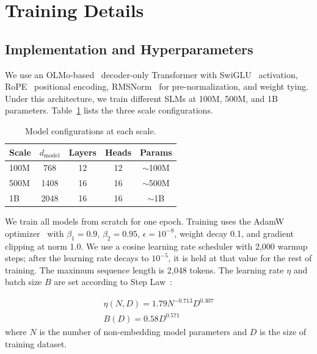 \documentclass[11pt]{article}
\begin{document}


\appendix

\section{Training Details}
\label{sec:training}

\subsection{Implementation and Hyperparameters}

We use an OLMo-based~\cite{groeneveld-etal-2024-olmo} decoder-only Transformer with SwiGLU~\cite{shazeer2020gluSWIGLU} activation, RoPE~\cite{su2024roformerROPE} positional encoding, RMSNorm~\cite{zhang2019rootRMS} for pre-normalization, and weight tying.
Under this architecture, we train different SLMs at 100M, 500M, and 1B parameters. Table~\ref{tab:scales} lists the three scale configurations.

\begin{table}[htbp]
  \centering
  \begin{tabular}{lcccc}
    \toprule
    Scale & $d_\text{model}$ & Layers & Heads & Params \\
    \midrule
    100M & 768 & 12 & 12 & $\sim$100M \\
    500M & 1408 & 16 & 16 & $\sim$500M \\
    1B & 2048 & 16 & 16 & $\sim$1B \\
    \bottomrule
  \end{tabular}
  \caption{Model configurations at each scale.}
  \label{tab:scales}
\end{table}

We train all models from scratch for one epoch. Training uses the AdamW optimizer~\cite{loshchilov2017decoupledADAM} with $\beta_1{=}0.9$, $\beta_2{=}0.95$, $\epsilon{=}10^{-8}$, weight decay 0.1, and gradient clipping at norm 1.0. We use a cosine learning rate scheduler with 2,000 warmup steps; after the learning rate decays to $10^{-5}$, it is held at that value for the rest of training. The maximum sequence length is 2,048 tokens. The learning rate $\eta$ and batch size $B$ are set according to Step Law~\cite{li2025predictable}:

\begin{equation}
    \begin{gathered}
       \eta(N,D) = 1.79N^{-0.713}D^{0.307} \\
B(D) = 0.58D^{0.571}
    \end{gathered}
\label{eq:steplaw}
\end{equation}
where $N$ is the number of non-embedding model parameters and $D$ is the size of training dataset. 
\end{document}
